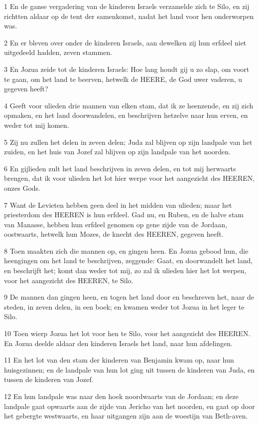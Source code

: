 \par 1 En de ganse vergadering van de kinderen Israels verzamelde zich te Silo, en zij richtten aldaar op de tent der samenkomst, nadat het land voor hen onderworpen was.
\par 2 En er bleven over onder de kinderen Israels, aan dewelken zij hun erfdeel niet uitgedeeld hadden, zeven stammen.
\par 3 En Jozua zeide tot de kinderen Israels: Hoe lang houdt gij u zo slap, om voort te gaan, om het land te beerven, hetwelk de HEERE, de God uwer vaderen, u gegeven heeft?
\par 4 Geeft voor ulieden drie mannen van elken stam, dat ik ze heenzende, en zij zich opmaken, en het land doorwandelen, en beschrijven hetzelve naar hun erven, en weder tot mij komen.
\par 5 Zij nu zullen het delen in zeven delen; Juda zal blijven op zijn landpale van het zuiden, en het huis van Jozef zal blijven op zijn landpale van het noorden.
\par 6 En gijlieden zult het land beschrijven in zeven delen, en tot mij herwaarts brengen, dat ik voor ulieden het lot hier werpe voor het aangezicht des HEEREN, onzes Gods.
\par 7 Want de Levieten hebben geen deel in het midden van ulieden; maar het priesterdom des HEEREN is hun erfdeel. Gad nu, en Ruben, en de halve stam van Manasse, hebben hun erfdeel genomen op gene zijde van de Jordaan, oostwaarts, hetwelk hun Mozes, de knecht des HEEREN, gegeven heeft.
\par 8 Toen maakten zich die mannen op, en gingen heen. En Jozua gebood hun, die heengingen om het land te beschrijven, zeggende: Gaat, en doorwandelt het land, en beschrijft het; komt dan weder tot mij, zo zal ik ulieden hier het lot werpen, voor het aangezicht des HEEREN, te Silo.
\par 9 De mannen dan gingen heen, en togen het land door en beschreven het, naar de steden, in zeven delen, in een boek; en kwamen weder tot Jozua in het leger te Silo.
\par 10 Toen wierp Jozua het lot voor hen te Silo, voor het aangezicht des HEEREN. En Jozua deelde aldaar den kinderen Israels het land, naar hun afdelingen.
\par 11 En het lot van den stam der kinderen van Benjamin kwam op, naar hun huisgezinnen; en de landpale van hun lot ging uit tussen de kinderen van Juda, en tussen de kinderen van Jozef.
\par 12 En hun landpale was naar den hoek noordwaarts van de Jordaan; en deze landpale gaat opwaarts aan de zijde van Jericho van het noorden, en gaat op door het gebergte westwaarts, en haar uitgangen zijn aan de woestijn van Beth-aven.
